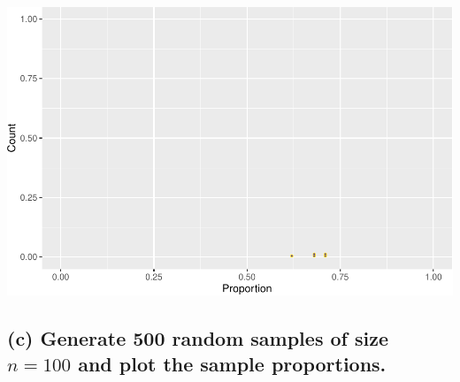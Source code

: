 \documentclass[
]{book}
\begin{document}
\includegraphics[width=1\linewidth]{Class_Activity_7_files/figure-latex/unnamed-chunk-11-1}

\hypertarget{c-generate-500-random-samples-of-size-n-100-and-plot-the-sample-proportions.}{%
\subsection{\texorpdfstring{(c) Generate 500 random samples of size \(n= 100\) and plot the sample proportions.}{(c) Generate 500 random samples of size n= 100 and plot the sample proportions.}}\label{c-generate-500-random-samples-of-size-n-100-and-plot-the-sample-proportions.}}
\end{document}
